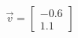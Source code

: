 \documentclass[preview]{standalone}
\begin{document}
\begin{align*}
\vec{v}=\begin{bmatrix}-0.6\\1.1\end{bmatrix}
\end{align*}
\end{document}
